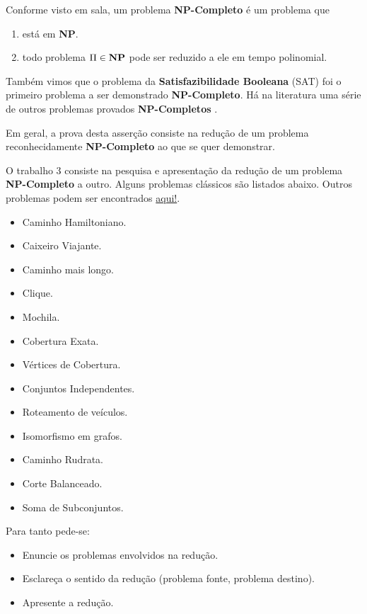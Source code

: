 \documentclass[12pt, a4paper]{article}
\begin{document}


\tableofcontents
\pagebreak

\listoffigures
\pagebreak

Conforme visto em sala, um problema \textbf{NP-Completo} é um problema que

\begin{enumerate}
  \item está em \textbf{NP}.
  \item todo problema $\Pi \in \text{\textbf{NP}}$ pode ser reduzido a ele em tempo polinomial.
\end{enumerate}

Também vimos que o problema da \textbf{Satisfazibilidade Booleana} (SAT) foi o primeiro problema a ser demonstrado \textbf{NP-Completo}. Há na literatura uma série de outros problemas provados \textbf{NP-Completos} \cite{newton04}.

Em geral, a prova desta asserção consiste na redução de um problema reconhecidamente \textbf{NP-Completo} ao que se quer demonstrar.

O trabalho 3 consiste na pesquisa e apresentação da redução de um problema \textbf{NP-Completo}
a outro. Alguns problemas clássicos são listados abaixo. Outros problemas podem ser encontrados \href{http://en.wikipedia.org/wiki/List_of_NP-complete_problems}{aqui!}.

\begin{itemize}
  \item Caminho Hamiltoniano.
  \item Caixeiro Viajante.
  \item Caminho mais longo.
  \item Clique.
  \item Mochila.
  \item Cobertura Exata.
  \item Vértices de Cobertura.
  \item Conjuntos Independentes.
  \item Roteamento de veículos.
  \item Isomorfismo em grafos.
  \item Caminho Rudrata.
  \item Corte Balanceado.
  \item Soma de Subconjuntos.
\end{itemize}

Para tanto pede-se:

\begin{itemize}
  \item Enuncie os problemas envolvidos na redução.
  \item Esclareça o sentido da redução (problema fonte, problema destino).
  \item Apresente a redução.
\end{itemize}
\end{document}
